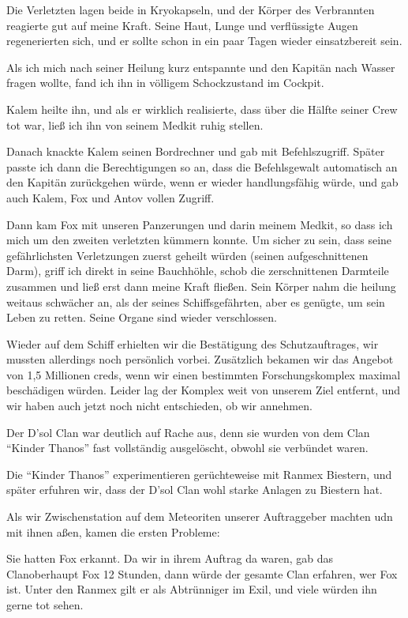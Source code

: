 \documentclass[11pt]{article}
\begin{document}
Die Verletzten lagen beide in Kryokapseln, und der Körper des
Verbrannten reagierte gut auf meine Kraft. Seine Haut, Lunge und
verflüssigte Augen regenerierten sich, und er sollte schon in ein paar
Tagen wieder einsatzbereit sein.

Als ich mich nach seiner Heilung kurz entspannte und den Kapitän nach
Wasser fragen wollte, fand ich ihn in völligem Schockzustand im Cockpit.

Kalem heilte ihn, und als er wirklich realisierte, dass über die Hälfte
seiner Crew tot war, ließ ich ihn von seinem Medkit ruhig stellen.

Danach knackte Kalem seinen Bordrechner und gab mit Befehlszugriff.
Später passte ich dann die Berechtigungen so an, dass die Befehlsgewalt
automatisch an den Kapitän zurückgehen würde, wenn er wieder
handlungsfähig würde, und gab auch Kalem, Fox und Antov vollen Zugriff.

Dann kam Fox mit unseren Panzerungen und darin meinem Medkit, so dass
ich mich um den zweiten verletzten kümmern konnte. Um sicher zu sein,
dass seine gefährlichsten Verletzungen zuerst geheilt würden (seinen
aufgeschnittenen Darm), griff ich direkt in seine Bauchhöhle, schob die
zerschnittenen Darmteile zusammen und ließ erst dann meine Kraft
fließen. Sein Körper nahm die heilung weitaus schwächer an, als der
seines Schiffsgefährten, aber es genügte, um sein Leben zu retten. Seine
Organe sind wieder verschlossen.

Wieder auf dem Schiff erhielten wir die Bestätigung des Schutzauftrages,
wir mussten allerdings noch persönlich vorbei. Zusätzlich bekamen wir
das Angebot von 1,5 Millionen creds, wenn wir einen bestimmten
Forschungskomplex maximal beschädigen würden. Leider lag der Komplex
weit von unserem Ziel entfernt, und wir haben auch jetzt noch nicht
entschieden, ob wir annehmen.

Der D'sol Clan war deutlich auf Rache aus, denn sie wurden von dem Clan
``Kinder Thanos'' fast vollständig ausgelöscht, obwohl sie verbündet
waren.

Die ``Kinder Thanos'' experimentieren gerüchteweise mit Ranmex Biestern,
und später erfuhren wir, dass der D'sol Clan wohl starke Anlagen zu
Biestern hat.

Als wir Zwischenstation auf dem Meteoriten unserer Auftraggeber machten
udn mit ihnen aßen, kamen die ersten Probleme:

Sie hatten Fox erkannt. Da wir in ihrem Auftrag da waren, gab das
Clanoberhaupt Fox 12 Stunden, dann würde der gesamte Clan erfahren, wer
Fox ist. Unter den Ranmex gilt er als Abtrünniger im Exil, und viele
würden ihn gerne tot sehen.
\end{document}
